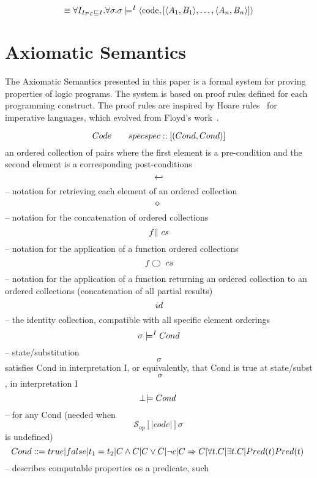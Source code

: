 $$ \equiv \forall I _{I_{\mathcal{PL}} \sqsubseteq I}. \forall \sigma.
 \sigma \models^{I} \langle \text{code}, [\langle A_{1}, B_{1}
      \rangle,\ldots, \langle A_{n}, B_{n} \rangle] \rangle$$

\section{Axiomatic Semantics}
\label{sec:ax-sem}
The Axiomatic Semantics presented in this paper is a formal system for
proving properties of logic programs.
%
The system is based on proof rules defined for each programming
construct.
%
The proof rules are inspired by Hoare rules~\cite{} for imperative
languages, which evolved from Floyd's work~\cite{}.



$$      Code \qquad  spec\\
      \\
      spec :: [ (Cond, Cond)]\\
      $$an ordered collection of pairs where the first element is a
      pre-condition and the second element is a corresponding post-conditions$$
      \linebreak
      \hookleftarrow  $$-- notation for retrieving each element of an
      ordered collection$$
      \linebreak
      \diamond\  $$-- notation for the concatenation of
      ordered collections$$
      \linebreak
      f\|\ cs $$-- notation for the application of a function
      ordered collections$$
      \linebreak
      f\bigcirc\ cs $$-- notation for the application of a function
      returning an ordered collection to an
      ordered collections (concatenation of all partial results)$$
      \linebreak
      id $$-- the identity collection, compatible with all specific
      element orderings$$
      \linebreak
      \sigma \models^I Cond  $$-- state/substitution$$\ \sigma\ $$satisfies
      Cond in interpretation I, or equivalently, that Cond is true at
      state/subst$$\ \sigma$$, in interpretation I$$
      \linebreak
      \perp \models Cond\ $$-- for any Cond (needed when
      $$\mathcal{S}_{op}[|code|]\sigma\ $$is undefined)$$
      \linebreak
      Cond ::= true | false | t_1 = t_2 | C \wedge C | C \vee C | \neg c |
      C \Rightarrow C | \forall t. C | \exists t. C | Pred(t)
      \linebreak
      Pred(t)\ $$-- describes computable properties os a predicate, such

